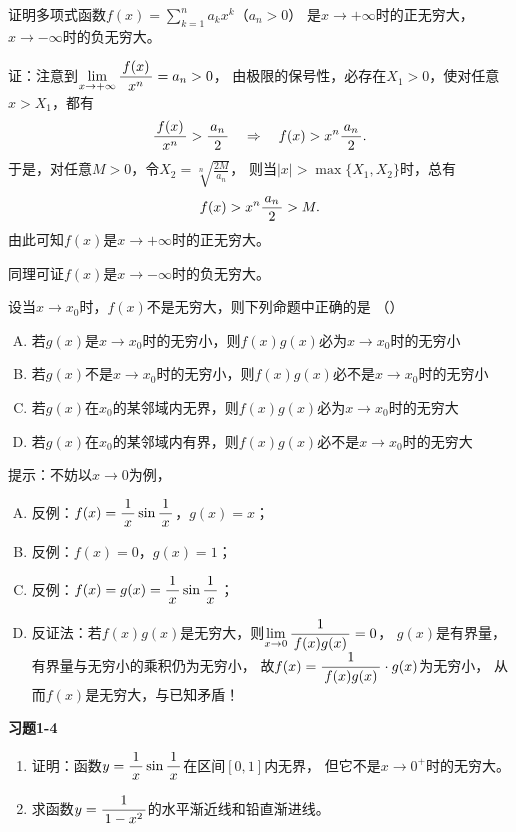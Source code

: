 \bs
\egz 证明多项式函数$f(x)=\sum\limits_{k=1}^{n}a_kx^k$（$a_n> 0$）
是$x\to+\infty$时的正无穷大，$x\to-\infty$时的负无穷大。

证：注意到$\lim\limits_{x\to{+\infty}}\displaystyle\frac{\,{f(x)}\,}{\,{x^n}\,}=a_n>0$，
由极限的保号性，必存在$X_1>0$，使对任意$x>X_1$，都有
$$\displaystyle\frac{\,{f(x)}\,}{\,{x^n}\,}>\displaystyle\frac{\,{a_n}\,}{\,{2}\,}\quad\Rightarrow
\quad f(x)>x^n\displaystyle\frac{\,{a_n}\,}{\,{2}\,}.$$
于是，对任意$M>0$，令$X_2=\sqrt[n]{\frac{2M}{a_n}}$，
则当$|x|>\max\{X_1,X_2\}$时，总有
$$f(x)>x^n\displaystyle\frac{\,{a_n}\,}{\,{2}\,}>M.$$
由此可知$f(x)$是$x\to+\infty$时的正无穷大。

同理可证$f(x)$是$x\to-\infty$时的负无穷大。
\fin

\bs
\egz 设当$x\to x_0$时，$f(x)$不是无穷大，则下列命题中正确的是
（\underline{\quad\quad}）
\begin{enumerate}[(A)]
  \setlength{\itemindent}{1cm}
  \item 若$g(x)$是$x\to x_0$时的无穷小，则$f(x)g(x)$必为$x\to x_0$时的无穷小
  \item 若$g(x)$不是$x\to x_0$时的无穷小，则$f(x)g(x)$必不是$x\to x_0$时的无穷小
  \item 若$g(x)$在$x_0$的某邻域内无界，则$f(x)g(x)$必为$x\to x_0$时的无穷大
  \item 若$g(x)$在$x_0$的某邻域内有界，则$f(x)g(x)$必不是$x\to x_0$时的无穷大
\end{enumerate}

\ifhint
提示：不妨以$x\to0$为例，
\begin{enumerate}[(A)]
    \setlength{\itemindent}{1cm}
	\item 反例：$f(x)=\displaystyle\frac{\,{1}\,}{\,{x}\,}\sin\displaystyle\frac{\,{1}\,}{\,{x}\,}$，$g(x)=x$；
	\item 反例：$f(x)=0$，$g(x)=1$；
	\item 反例：$f(x)=g(x)=\displaystyle\frac{\,{1}\,}{\,{x}\,}\sin\displaystyle\frac{\,{1}\,}{\,{x}\,}$；
	\item 反证法：若$f(x)g(x)$是无穷大，则$\lim\limits_{x\to{0}}\displaystyle\frac{\,{1}\,}{\,{f(x)g(x)}\,}=0$，
	$g(x)$是有界量，有界量与无穷小的乘积仍为无穷小，
	故$f(x)=\displaystyle\frac{\,{1}\,}{\,{f(x)g(x)}\,}\cdot g(x)$为无穷小，
	从而$f(x)$是无穷大，与已知矛盾！\fin
\end{enumerate}
\fi

\bs
\begin{ext}
	{\centering\bf 习题1-4}
	
	\begin{enumerate}  
	  \item 证明：函数$y=\displaystyle\frac{\,{1}\,}{\,{x}\,}\sin\displaystyle\frac{\,{1}\,}{\,{x}\,}$在区间$[0,1]$内无界，
	  但它不是$x\to 0^+$时的无穷大。
	  \item 求函数$y=\displaystyle\frac{\,{1}\,}{\,{1-x^2}\,}$的水平渐近线和铅直渐进线。
	\end{enumerate}
\end{ext}

